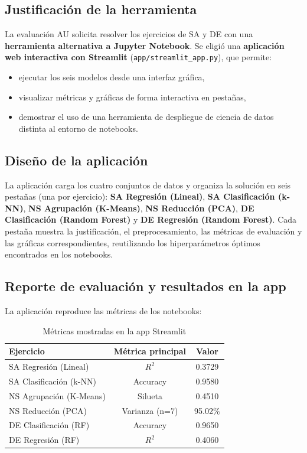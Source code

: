 \documentclass[12pt,a4paper]{article}
\begin{document}
\subsection{Justificación de la herramienta}
La evaluación AU solicita resolver los ejercicios de SA y DE con una
\textbf{herramienta alternativa a Jupyter Notebook}. Se eligió una
\textbf{aplicación web interactiva con Streamlit} (\texttt{app/streamlit\_app.py}),
que permite:
\begin{itemize}[itemsep=2pt]
\item ejecutar los seis modelos desde una interfaz gráfica,
\item visualizar métricas y gráficas de forma interactiva en pestañas,
\item demostrar el uso de una herramienta de despliegue de ciencia de datos distinta
      al entorno de notebooks.
\end{itemize}

\subsection{Diseño de la aplicación}
La aplicación carga los cuatro conjuntos de datos y organiza la solución en seis
pestañas (una por ejercicio): \textbf{SA Regresión (Lineal)}, \textbf{SA
Clasificación (k-NN)}, \textbf{NS Agrupación (K-Means)}, \textbf{NS Reducción
(PCA)}, \textbf{DE Clasificación (Random Forest)} y \textbf{DE Regresión (Random
Forest)}. Cada pestaña muestra la justificación, el preprocesamiento, las métricas
de evaluación y las gráficas correspondientes, reutilizando los hiperparámetros
óptimos encontrados en los notebooks.

\subsection{Reporte de evaluación y resultados en la app}
La aplicación reproduce las métricas de los notebooks:
\begin{table}[H]
\centering
\caption{Métricas mostradas en la app Streamlit}
\begin{tabular}{lcc}
\toprule
\textbf{Ejercicio} & \textbf{Métrica principal} & \textbf{Valor} \\
\midrule
SA Regresión (Lineal) & $R^2$ & 0.3729 \\
SA Clasificación (k-NN) & Accuracy & 0.9580 \\
NS Agrupación (K-Means) & Silueta & 0.4510 \\
NS Reducción (PCA) & Varianza (n=7) & 95.02\% \\
DE Clasificación (RF) & Accuracy & 0.9650 \\
DE Regresión (RF) & $R^2$ & 0.4060 \\
\bottomrule
\end{tabular}
\end{table}
\end{document}
